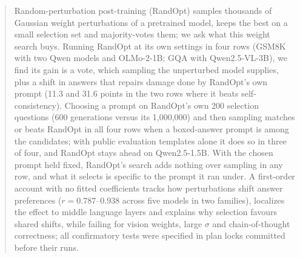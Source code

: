 \documentclass{article}
\begin{document}
\printAffiliationsAndNotice{}


\begin{abstract}
Random-perturbation post-training (RandOpt) samples thousands of Gaussian weight perturbations of a pretrained model,
keeps the best on a small selection set and majority-votes them; we ask what this weight search buys. Running RandOpt at
its own settings in four rows (GSM8K with two Qwen models and OLMo-2-1B; GQA with Qwen2.5-VL-3B), we find its gain is a
vote, which sampling the unperturbed model supplies, plus a shift in answers that repairs damage done by RandOpt's own
prompt (11.3 and 31.6 points in the two rows where it beats self-consistency). Choosing a prompt on RandOpt's own
200 selection questions (600 generations versus its 1,000,000) and then sampling matches or beats RandOpt in all four
rows when a boxed-answer prompt is among the candidates; with public evaluation templates alone it does so in three of
four, and RandOpt stays ahead on Qwen2.5-1.5B. With the chosen prompt held fixed, RandOpt's search adds nothing over sampling in any row, and what it selects is
specific to the prompt it ran under. A first-order account with no fitted coefficients tracks how perturbations shift
answer preferences ($r = 0.787$--$0.938$ across five models in two families), localizes the effect to middle language
layers and explains why selection favours shared shifts, while failing for vision weights, large $\sigma$ and
chain-of-thought correctness; all confirmatory tests were specified in plan locks committed before their runs.
\end{abstract}

\end{document}

